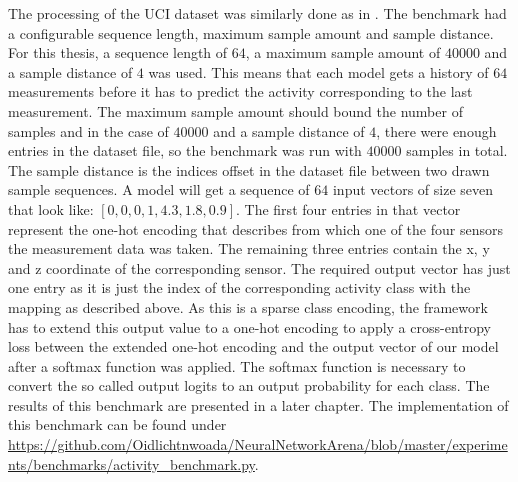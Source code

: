 \documentclass[draft,final]{vutinfth} %
\begin{document}
    The processing of the UCI dataset was similarly done as in \cite{ODELSTM}.
    The benchmark had a configurable sequence length, maximum sample amount and sample distance.
    For this thesis, a sequence length of $64$, a maximum sample amount of $40000$ and a sample distance of $4$ was used.
    This means that each model gets a history of $64$ measurements before it has to predict the activity corresponding to the last measurement.
    The maximum sample amount should bound the number of samples and in the case of $40000$ and a sample distance of $4$, there were enough entries in the dataset file, so the benchmark was run with $40000$ samples in total.
    The sample distance is the indices offset in the dataset file between two drawn sample sequences.
    A model will get a sequence of $64$ input vectors of size seven that look like: $[0,0,0,1,4.3,1.8,0.9]$.
    The first four entries in that vector represent the one-hot encoding that describes from which one of the four sensors the measurement data was taken.
    The remaining three entries contain the x, y and z coordinate of the corresponding sensor.
    The required output vector has just one entry as it is just the index of the corresponding activity class with the mapping as described above.
    As this is a sparse class encoding, the framework has to extend this output value to a one-hot encoding to apply a cross-entropy loss between the extended one-hot encoding and the output vector of our model after a softmax function was applied.
    The softmax function is necessary to convert the so called output logits to an output probability for each class.
    The results of this benchmark are presented in a later chapter.
    The implementation of this benchmark can be found under \url{https://github.com/Oidlichtnwoada/NeuralNetworkArena/blob/master/experiments/benchmarks/activity_benchmark.py}.
    
\end{document}
